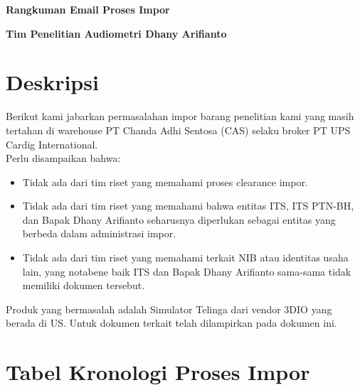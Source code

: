 \documentclass{article} %
\begin{document}
	\begin{titlepage}

		\centering %

		{
			\LARGE %
			\bf %
			Rangkuman Email Proses Impor
		}

		\bigskip
		{\Large \bf Tim Penelitian Audiometri Dhany Arifianto}
		\vfill %
	\end{titlepage}

	\newpage
	\section{Deskripsi}

	Berikut kami jabarkan permasalahan impor barang penelitian kami yang masih tertahan di warehouse PT Chanda Adhi Sentosa (CAS) selaku broker PT UPS Cardig International.\\

	Perlu disampaikan bahwa:
	\begin{itemize}
		\item Tidak ada dari tim riset yang memahami proses clearance impor.
		\item Tidak ada dari tim riset yang memahami bahwa entitas ITS, ITS PTN-BH, dan Bapak Dhany Arifianto seharusnya diperlukan sebagai entitas yang berbeda dalam administrasi impor.
		\item Tidak ada dari tim riset yang memahami terkait NIB atau identitas usaha lain, yang notabene baik ITS dan Bapak Dhany Arifianto sama-sama tidak memiliki dokumen tersebut.
	\end{itemize}

	Produk yang bermasalah adalah Simulator Telinga dari vendor 3DIO yang berada di US.
	Untuk dokumen terkait telah dilampirkan pada dokumen ini.

	\section{Tabel Kronologi Proses Impor}
\end{document}

